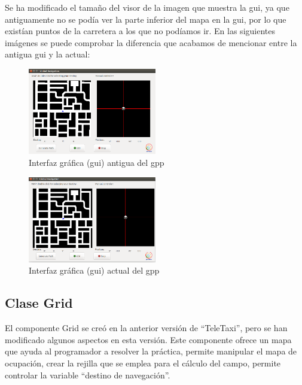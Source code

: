Se ha modificado el tamaño del visor de la imagen que muestra la \acrshort{gui}, ya que antiguamente no se podía ver la parte inferior del mapa en la \acrshort{gui}, por lo que existían puntos de la carretera a los que no podíamos ir. En las siguientes imágenes se puede comprobar la diferencia que acabamos de mencionar entre la antigua \acrshort{gui} y la actual:
\begin{figure}[H]
  \begin{center}
    \includegraphics[width=0.5\textwidth]{figures/GPP/GUI_mal.png}
		\caption{Interfaz gráfica (\acrshort{gui}) antigua del \acrshort{gpp}}
		\label{fig.gui_mal}
		\end{center}
\end{figure}

\begin{figure}[H]
  \begin{center}
    \includegraphics[width=0.5\textwidth]{figures/GPP/GUI_correcta.png}
		\caption{Interfaz gráfica (\acrshort{gui}) actual del \acrshort{gpp}}
		\label{fig.gui_correcta}
		\end{center}
\end{figure}

\subsection{Clase Grid}
El componente Grid se creó en la anterior versión de ``TeleTaxi'', pero se han modificado algunos aspectos en esta versión. Este componente ofrece un mapa que ayuda al programador a resolver la práctica, permite manipular el mapa de ocupación, crear la rejilla que se emplea para el cálculo del campo, permite controlar la variable ``destino de navegación''.\\

